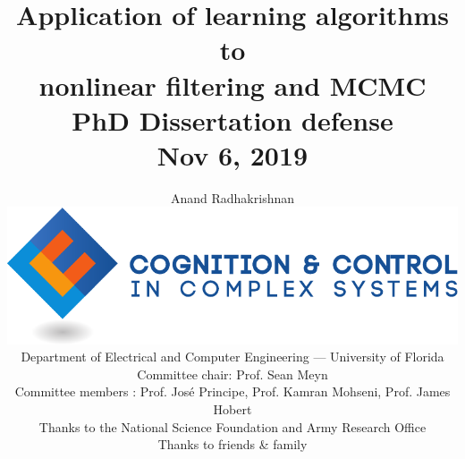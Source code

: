 \documentclass[xcolor=dvipsnames, subsection=false]{beamer}
\def\alertc#1{\alert{\color{MyDarkBlue}  #1}}
\def\alertc#1{\alert{\color{MyDarkBlue}  #1}}
\begin{document}
\thispagestyle{empty}
\setcounter{page}{0}



\title{\Large
	\textbf{Application of learning algorithms to
		\\
		nonlinear filtering and MCMC}
	\\[.5em]
	\normalsize
	PhD Dissertation defense
	\\[.5em]
	\scriptsize
	Nov 6, 2019}

\author{
	\small Anand Radhakrishnan
	\\[.2cm]
	\href{http://ccc.centers.ufl.edu/}{\includegraphics[width=.2\hsize]{c3logocmyk.pdf}}
	\\[.2cm]
	\small
	\scriptsize
	Department of Electrical and Computer Engineering
	---
	University of Florida
	\\[.3cm]\color{Sepia}
	\scriptsize
	Committee chair: \alertc{Prof. Sean Meyn}
	\\[.25cm]
	Committee members : \alertc{Prof. Jos\'{e} Principe, Prof. Kamran Mohseni, Prof. James Hobert}
	\\[.25cm]
	\scriptsize \color{Sepia} 
	Thanks to the National Science Foundation and Army Research Office \\
   \scriptsize \color{Sepia}
   Thanks to friends \& family}
\date{}

\frame{\titlepage}
\end{document}

